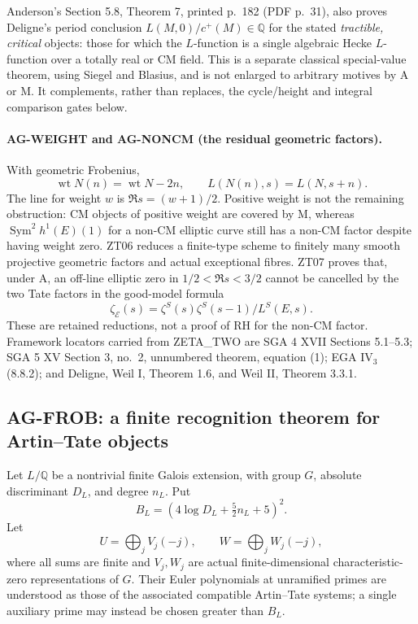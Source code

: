 \documentclass[11pt,a4paper]{article}
\begin{document}
Anderson's Section 5.8, Theorem 7, printed p.~182 (PDF p.~31), also
proves Deligne's period conclusion
$L(M,0)/c^+(M)\in\mathbb Q$ for the stated \emph{tractible, critical}
objects: those for which the $L$-function is a single algebraic Hecke
$L$-function over a totally real or CM field. This is a separate
classical special-value theorem, using Siegel and Blasius, and is not
enlarged to arbitrary motives by A or M. It complements, rather than
replaces, the cycle/height and integral comparison gates below.

\paragraph{AG-WEIGHT and AG-NONCM (the residual geometric factors).}
With geometric Frobenius,
\[
 \operatorname{wt}N(n)=\operatorname{wt}N-2n,
 \qquad L(N(n),s)=L(N,s+n).
\]
The line for weight $w$ is $\Re s=(w+1)/2$. Positive weight is not the
remaining obstruction: CM objects of positive weight are covered by M,
whereas $\operatorname{Sym}^2h^1(E)(1)$ for a non-CM elliptic curve still
has a non-CM factor despite having weight zero. ZT06 reduces a finite-type
scheme to finitely many smooth projective geometric factors and actual
exceptional fibres. ZT07 proves that, under A, an off-line elliptic zero
in $1/2<\Re s<3/2$ cannot be cancelled by the two Tate factors in the
good-model formula
\[
 \zeta_{\mathcal E}(s)
   =\zeta^S(s)\zeta^S(s-1)/L^S(E,s).
\]
These are retained reductions, not a proof of RH for the non-CM factor.
Framework locators carried from ZETA\_TWO are SGA 4 XVII Sections 5.1--5.3;
SGA 5 XV Section 3, no.~2, unnumbered theorem, equation (1);
EGA IV$_3$ (8.8.2); and Deligne, Weil I, Theorem 1.6, and Weil II,
Theorem 3.3.1.

\subsection{AG-FROB: a finite recognition theorem for Artin--Tate objects}
\label{ag:frob}

Let $L/\mathbb Q$ be a nontrivial finite Galois extension, with group $G$,
absolute discriminant $D_L$, and degree $n_L$. Put
\[
 B_L=(4\log D_L+\tfrac52 n_L+5)^2.
\]
Let
\[
 U=\bigoplus_j V_j(-j),\qquad W=\bigoplus_j W_j(-j),
\]
where all sums are finite and $V_j,W_j$ are actual finite-dimensional
characteristic-zero representations of $G$. Their Euler polynomials at
unramified primes are understood as those of the associated compatible
Artin--Tate systems; a single auxiliary prime may instead be chosen greater
than $B_L$.
\end{document}
